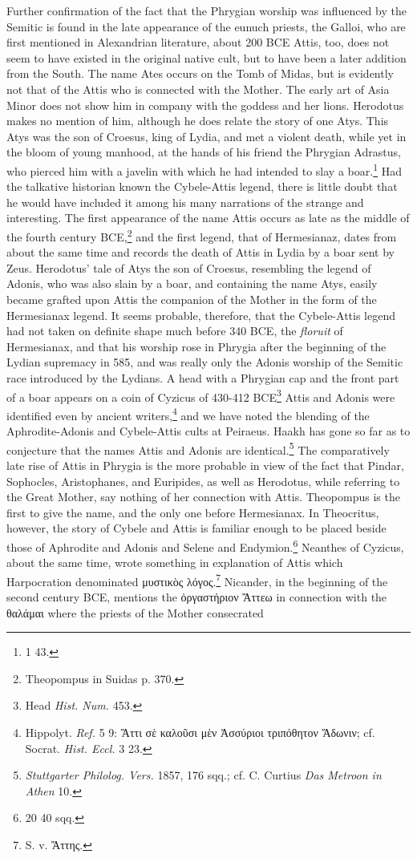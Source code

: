 \documentclass[a4paper, 11pt, oneside, polutonikogreek, french]{article}
\begin{document}
Further confirmation of the fact that the Phrygian worship was influenced by the Semitic is found in the late appearance of the eunuch priests, the Galloi, who are first mentioned in Alexandrian literature, about 200 \textsc{BCE} Attis, too, does not seem to have existed in the original native cult, but to have been a later addition from the South. The name Ates occurs on the Tomb of Midas, but is evidently not that of the Attis who is connected with the Mother. The early art of Asia Minor does not show him in company with the goddess and her lions. Herodotus makes no mention of him, although he does relate the story of one Atys. This Atys was the son of Croesus, king of Lydia, and met a violent death, while yet in the bloom of young manhood, at the hands of his friend the Phrygian Adrastus, who pierced him with a javelin with which he had intended to slay a boar.\footnote{1 43.} Had the talkative historian known the Cybele-Attis legend, there is little doubt that he would have included it among his many narrations of the strange and interesting. The first appearance of the name Attis occurs as late as the middle of the fourth century \textsc{BCE},\footnote{Theopompus in Suidas p. 370.} and the first legend, that of Hermesianaz, dates from about the same time and records the death of Attis in Lydia by a boar sent by Zeus. Herodotus' tale of Atys the son of Croesus, resembling the legend of Adonis, who was also slain by a boar, and containing the name Atys, easily became grafted upon Attis the companion of the Mother in the form of the Hermesianax legend. It seems probable, therefore, that the Cybele-Attis legend had not taken on definite shape much before 340 \textsc{BCE}, the \emph{floruit} of Hermesianax, and that his worship rose in Phrygia after the beginning of the Lydian supremacy in 585, and was really only the Adonis worship of the Semitic race introduced by the Lydians. A head with a Phrygian cap and the front part of a boar appears on a coin of Cyzicus of 430-412 \textsc{BCE}\footnote{Head \emph{Hist. Num.} 453.} Attis and Adonis were identified even by ancient writers,\footnote{Hippolyt. \emph{Ref.} 5 9: Ἄττι σὲ καλοῦσι μὲν Ἀσσύριοι τριπόθητον Ἄδωνιν; cf. Socrat. \emph{Hist. Eccl.} 3 23.} and we have noted the blending of the Aphrodite-Adonis and Cybele-Attis cults at Peiraeus. Haakh has gone so far as to conjecture that the names Attis and Adonis are identical.\footnote{\emph{Stuttgarter Philolog. Vers.} 1857, 176 sqq.; cf. C. Curtius \emph{Das Metroon in Athen} 10.} The comparatively late rise of Attis in Phrygia is the more probable in view of the fact that Pindar, Sophocles, Aristophanes, and Euripides, as well as Herodotus, while referring to the Great Mother, say nothing of her connection with Attis. Theopompus is the first to give the name, and the only one before Hermesianax. In Theocritus, however, the story of Cybele and Attis is familiar enough to be placed beside those of Aphrodite and Adonis and Selene and Endymion.\footnote{20 40 sqq.} Neanthes of Cyzicus, about the same time, wrote something in explanation of Attis which Harpocration denominated μυστικὸς λόγος.\footnote{S. v. Ἄττης.} Nicander, in the beginning of the second century \textsc{BCE}, mentions the ὀργαστήριον Ἄττεω in connection with the θαλάμαι where the priests of the Mother consecrated 
\end{document}
